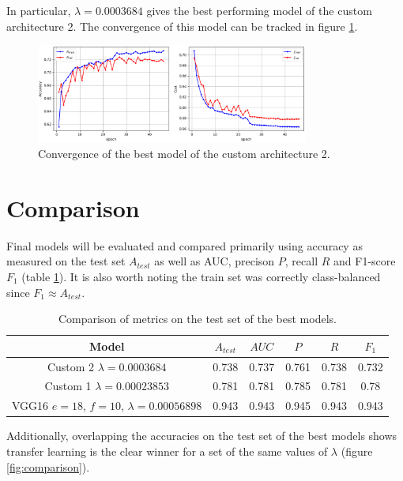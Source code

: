 In particular, $\lambda = 0.0003684$ gives the best performing model of the custom architecture 2. The convergence of this model can be tracked in figure \ref{fig:custom2_best_training}.

\begin{figure}[ht]
    \centering
    \includegraphics[width=0.8\textwidth]{figs/custom2_best_training.png}
    \caption{Convergence of the best model of the custom architecture 2.}
    \label{fig:custom2_best_training}
\end{figure}

\section{Comparison}

Final models will be evaluated and compared primarily using accuracy as measured on the test set $A_{test}$ as well as AUC, precison $P$, recall $R$ and F1-score $F_1$ (table \ref{table:comparison}). It is also worth noting the train set was correctly class-balanced since $F_1 \approx A_{test}$.

\begin{table}[ht]
\centering
\begin{tabular}{ |c|c|c|c|c|c| }
\hline
Model & $A_{test}$ & $AUC$ & $P$ & $R$ & $F_1$ \\
\hline
Custom 2 $\lambda = 0.0003684$                   & 0.738 & 0.737 & 0.761 & 0.738 & 0.732 \\
Custom 1 $\lambda = 0.00023853$                  & 0.781 & 0.781 & 0.785 & 0.781 & 0.78 \\
VGG16 $e = 18$, $f = 10$, $\lambda = 0.00056898$ & 0.943 & 0.943 & 0.945 & 0.943 & 0.943 \\
\hline
\end{tabular}
\caption{Comparison of metrics on the test set of the best models.}
\label{table:comparison}
\end{table}

Additionally, overlapping the accuracies on the test set of the best models shows transfer learning is the clear winner for a set of the same values of $\lambda$ (figure \ref{fig:comparison}).

